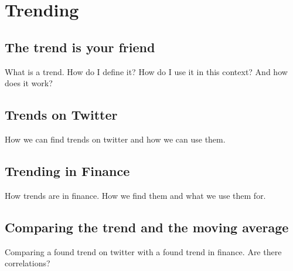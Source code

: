 
\chapter{Trending}

\section{The trend is your friend}
What is a trend. How do I define it? How do I use it in this context? And how
does it work? 

\section{Trends on Twitter}
How we can find trends on twitter and how we can use them. 
\section{Trending in Finance}
How trends are in finance. How we find them and what we use them for. 

\section{Comparing the trend and the moving average}
Comparing a found trend on twitter with a found trend in finance. Are there
correlations?   
